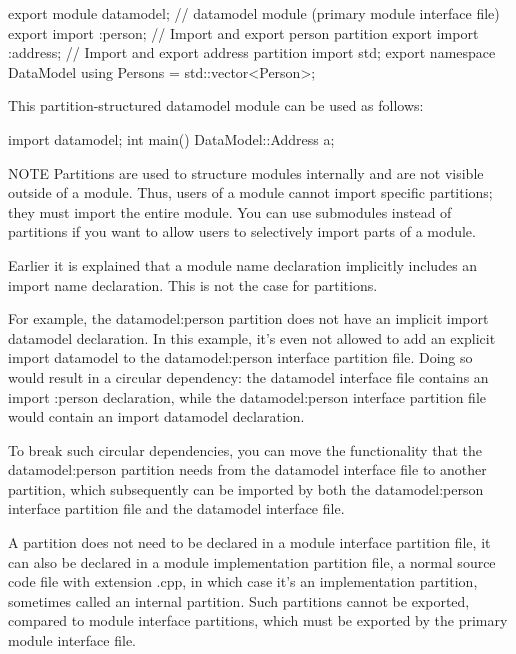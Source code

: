 \begin{cpp}
export module datamodel; // datamodel module (primary module interface file)
export import :person; // Import and export person partition
export import :address; // Import and export address partition
import std;
export namespace DataModel { using Persons = std::vector<Person>; }
\end{cpp}

This partition-structured datamodel module can be used as follows:

\begin{cpp}
import datamodel;
int main() { DataModel::Address a; }
\end{cpp}

\begin{myNotic}{NOTE}
Partitions are used to structure modules internally and are not visible outside of a module. Thus, users of a module cannot import specific partitions; they must import the entire module. You can use submodules instead of partitions if you want to allow users to selectively import parts of a module.
\end{myNotic}

Earlier it is explained that a module name declaration implicitly includes an import name declaration. This is not the case for partitions.

For example, the datamodel:person partition does not have an implicit import datamodel declaration. In this example, it’s even not allowed to add an explicit import datamodel to the datamodel:person interface partition file. Doing so would result in a circular dependency: the datamodel interface file contains an import :person declaration, while the datamodel:person interface partition file would contain an import datamodel declaration.

To break such circular dependencies, you can move the functionality that the datamodel:person partition needs from the datamodel interface file to another partition, which subsequently can be imported by both the datamodel:person interface partition file and the datamodel interface file.


A partition does not need to be declared in a module interface partition file, it can also be declared in a module implementation partition file, a normal source code file with extension .cpp, in which case it’s an implementation partition, sometimes called an internal partition. Such partitions cannot be exported, compared to module interface partitions, which must be exported by the primary module interface file.

